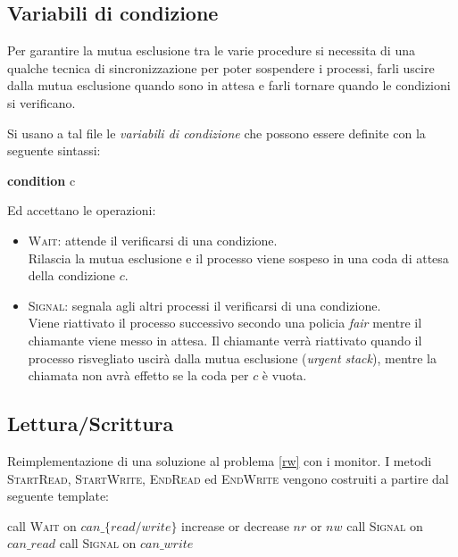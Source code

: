 \documentclass{article}
\begin{document}
\subsection{Variabili di condizione}

Per garantire la mutua esclusione tra le varie procedure si necessita di una
qualche tecnica di sincronizzazione per poter sospendere i processi, farli uscire
dalla mutua esclusione quando sono in attesa e farli tornare quando le condizioni
si verificano.

Si usano a tal file le \emph{variabili di condizione} che possono essere
definite con la seguente sintassi:
\begin{algorithmic}[0]
  \State \textbf{condition} c
\end{algorithmic}
Ed accettano le operazioni:
\begin{itemize}
  \item \textsc{Wait}: attende il verificarsi di una condizione. \\
    Rilascia la mutua esclusione e il processo viene sospeso in una coda di
    attesa della condizione $c$.
  \item \textsc{Signal}: segnala agli altri processi il verificarsi di una condizione. \\
    Viene riattivato il processo successivo secondo una policia \emph{fair} mentre
    il chiamante viene messo in attesa. Il chiamante verr\`a riattivato quando
    il processo risvegliato uscir\`a dalla mutua esclusione (\emph{urgent stack}),
    mentre la chiamata non avr\`a effetto se la coda per $c$ \`e vuota.
\end{itemize}

\subsection{Lettura/Scrittura}

Reimplementazione di una soluzione al problema \ref{rw} con i monitor. I metodi
\textsc{StartRead}, \textsc{StartWrite}, \textsc{EndRead} ed \textsc{EndWrite}
vengono costruiti a partire dal seguente template:
\begin{algorithmic}[0]
      \State call \textsc{Wait} on $can\_\{read/write\}$
    \EndIf
    \State increase or decrease $nr$ or $nw$
      \State call \textsc{Signal} on $can\_read$
    \EndIf
      \State call \textsc{Signal} on $can\_write$
    \EndIf
  \EndProcedureEntry
\end{algorithmic}
\end{document}
